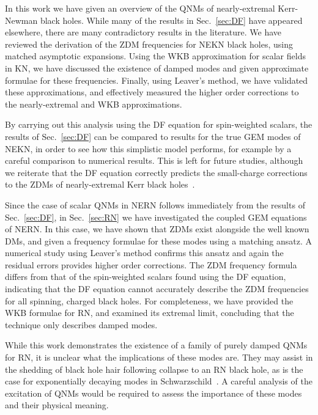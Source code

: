 \begin{refsection}
In this work we have given an overview of the QNMs of nearly-extremal Kerr-Newman black holes. 
While many of the results in Sec.~\ref{sec:DF} have appeared elsewhere, there are many contradictory results in the literature. We have reviewed the derivation of the ZDM frequencies for NEKN black holes, using matched asymptotic expansions. 
Using the WKB approximation for scalar fields in KN, we have discussed the existence of damped modes and given approximate formulae for these frequencies. 
Finally, using Leaver's method, we have validated these approximations, and effectively measured the higher order corrections to the nearly-extremal and WKB approximations.

By carrying out this analysis using the DF equation for spin-weighted scalars, the results of Sec.~\ref{sec:DF} can be compared to results for the true GEM modes of NEKN, in order to see how this simplistic model performs, for example by a careful comparison to numerical results. 
This is left for future studies, although we reiterate that the DF equation correctly predicts the small-charge corrections to the ZDMs of nearly-extremal Kerr black holes~\cite{Mark:2014aja}.

Since the case of scalar QNMs in NERN follows immediately from the results of Sec.~\ref{sec:DF}, in Sec.~\ref{sec:RN} we have investigated the coupled GEM equations of NERN. In this case, we have shown that ZDMs exist alongside the well known DMs, and given a frequency formulae for these modes using a matching ansatz. A numerical study using Leaver's method confirms this ansatz and again the residual errors provides higher order corrections. 
The ZDM frequency formula differs from that of the spin-weighted scalars found using the DF equation, indicating that the DF equation cannot accurately describe the ZDM frequencies for all spinning, charged black holes. 
For completeness, we have provided the WKB formulae for RN, and examined its extremal limit, concluding that the technique only describes damped modes.

While this work demonstrates the existence of a family of purely damped QNMs for RN, it is unclear what the implications of these modes are. They may assist in the shedding of black hole hair following collapse to an RN black hole, as is the case for exponentially decaying modes in Schwarzschild~\cite{Price:1971fb,Price:1972pw,wheeler1972magic}. A careful analysis of the excitation of QNMs would be required to assess the importance of these modes and their physical meaning.


\end{refsection}
